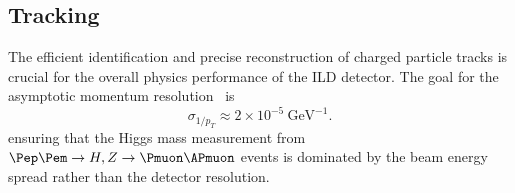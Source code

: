 \newcommand{\rmsn}{\mathrm{rms}_{90}}

\subsection{Tracking}

The efficient identification and precise reconstruction of charged particle
tracks is crucial for the overall physics performance of the ILD detector.
The goal for the asymptotic momentum resolution~\cite{ild:bib:perfgoal::barklow} is
\begin{equation*}
\sigma_{1/p_T} \approx 2\times 10^{-5}~\text{GeV}^{-1}.
\end{equation*}
ensuring that the Higgs mass measurement from $\Pep\Pem \rightarrow H, Z\rightarrow\Pmuon\APmuon$ events
is dominated by the beam energy spread rather than the detector resolution.

